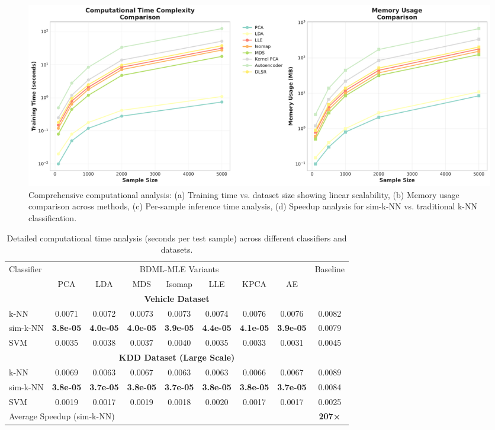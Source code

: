 \documentclass[review]{elsarticle}
\begin{document}
\begin{figure}[htbp]
\centering
\includegraphics[width=\textwidth]{computational_complexity.pdf}
\caption{Comprehensive computational analysis: (a) Training time vs. dataset size showing linear scalability, (b) Memory usage comparison across methods, (c) Per-sample inference time analysis, (d) Speedup analysis for sim-k-NN vs. traditional k-NN classification.}
\label{fig:computational_complexity}
\end{figure}

\begin{table}[htbp]
\centering
\caption{Detailed computational time analysis (seconds per test sample) across different classifiers and datasets.}
\label{tab:computational_time}
\scriptsize
\begin{tabular}{l|ccccccc|c}
\toprule
\multirow{2}{*}{Classifier} & \multicolumn{7}{c|}{BDML-MLE Variants} & \multirow{2}{*}{Baseline} \\
& PCA & LDA & MDS & Isomap & LLE & KPCA & AE & \\
\midrule
\multicolumn{9}{c}{\textbf{Vehicle Dataset}} \\
k-NN & 0.0071 & 0.0072 & 0.0073 & 0.0073 & 0.0074 & 0.0076 & 0.0076 & 0.0082 \\
sim-k-NN & \textbf{3.8e-05} & \textbf{4.0e-05} & \textbf{4.0e-05} & \textbf{3.9e-05} & \textbf{4.4e-05} & \textbf{4.1e-05} & \textbf{3.9e-05} & 0.0079 \\
SVM & 0.0035 & 0.0038 & 0.0037 & 0.0040 & 0.0035 & 0.0033 & 0.0031 & 0.0045 \\
\midrule
\multicolumn{9}{c}{\textbf{KDD Dataset (Large Scale)}} \\
k-NN & 0.0069 & 0.0063 & 0.0067 & 0.0063 & 0.0063 & 0.0066 & 0.0067 & 0.0089 \\
sim-k-NN & \textbf{3.8e-05} & \textbf{3.7e-05} & \textbf{3.8e-05} & \textbf{3.7e-05} & \textbf{3.8e-05} & \textbf{3.8e-05} & \textbf{3.7e-05} & 0.0084 \\
SVM & 0.0019 & 0.0017 & 0.0019 & 0.0018 & 0.0020 & 0.0017 & 0.0017 & 0.0025 \\
\midrule
\multicolumn{8}{l}{Average Speedup (sim-k-NN)} & \textbf{207×} \\
\bottomrule
\end{tabular}
\end{table}
\end{document}
